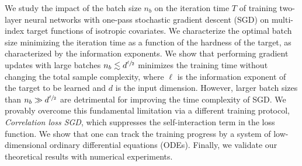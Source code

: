 We study the impact of the batch size $n_b$ on the iteration time $T$ of training two-layer neural networks with one-pass stochastic gradient descent (SGD) on multi-index target functions of isotropic covariates. We characterize the optimal batch size minimizing the iteration time as a function of the hardness of the target, as characterized by the information exponents.
We show that performing gradient updates with large batches $n_b \lesssim d^{\sfrac{\ell}{2}}$ minimizes the training time without changing the total sample complexity, where $\ell$ is the information exponent of the target to be learned \citep{arous2021online} and $d$ is the input dimension. However, larger batch sizes than $n_b \gg d^{\sfrac{\ell}{2}}$ are detrimental for improving the time complexity of SGD. We provably overcome this fundamental limitation via a different training protocol, \textit{Correlation loss SGD}, which suppresses the self-interaction term in the loss function. We show that one can track the training progress by a system of low-dimensional ordinary differential equations (ODEs). Finally, we validate our theoretical results with numerical experiments.
